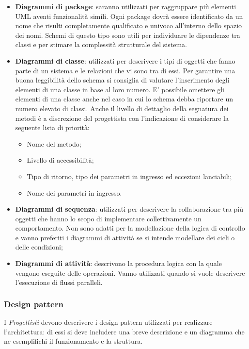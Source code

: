 		\begin{itemize}
		
		
		\item \textbf{Diagrammi di package}: saranno utilizzati per raggruppare più elementi UML aventi funzionalità simili. Ogni package dovrà essere identificato da un	nome che risulti completamente qualificato e univoco all’interno dello spazio
		dei nomi. Schemi di questo tipo sono utili per individuare le dipendenze tra classi e per stimare la complessità strutturale del sistema.
		\item \textbf{Diagrammi di classe}: utilizzati per descrivere i tipi di oggetti che fanno parte di un sistema e le relazioni che vi sono tra di essi. Per garantire una buona leggibilità dello schema si consiglia di valutare l'inserimento degli elementi di una classe in base al loro numero. E' possibile omettere gli elementi di una classe anche nel caso in cui lo schema debba riportare un numero elevato di classi. Anche il livello di dettaglio della segnatura dei metodi è a discrezione	del progettista con l’indicazione di considerare la seguente lista di priorità:
		\begin{itemize}		
		\item Nome del metodo;
		\item Livello di accessibilità;
		\item Tipo di ritorno, tipo dei parametri in ingresso ed eccezioni lanciabili;
		\item Nome dei parametri in ingresso.
		\end{itemize}
		\item \textbf{Diagrammi di sequenza}: utilizzati per descrivere la collaborazione tra più oggetti che hanno lo scopo di implementare collettivamente un comportamento. Non sono adatti per la modellazione della logica di controllo e vanno preferiti i diagrammi di attività se si intende modellare dei cicli o delle condizioni;
		\item \textbf{Diagrammi di attività}: descrivono la procedura logica con la quale vengono eseguite delle operazioni. Vanno utilizzati quando si vuole descrivere	l’esecuzione di flussi paralleli.
        \end{itemize}
 
	\subsubsection{Design pattern}
	I \textit{Progettisti} devono descrivere i design pattern utilizzati per realizzare l'architettura:
	di essi si deve includere una breve descrizione e un diagramma che ne esemplifichi il funzionamento e la struttura.
